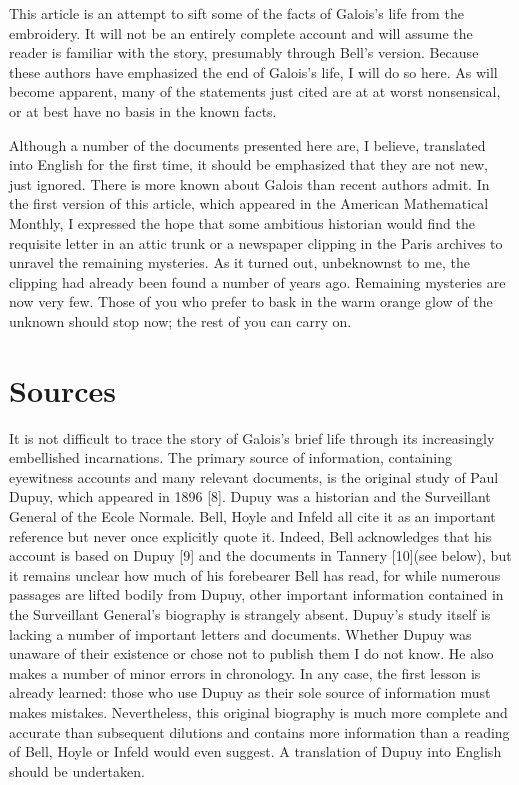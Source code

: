 \documentclass[12pt]{article}
\begin{document}
This article is an attempt to sift some of the facts of Galois's life from the embroidery. It will not be an entirely complete account and will assume the reader is familiar with the story, presumably through Bell's version. Because these authors have emphasized the end of Galois's life, I will do so here. As will become apparent, many of the statements just cited are at at worst nonsensical, or at best have no basis in the known facts.

Although a number of the documents presented here are, I believe, translated into English for the first time, it should be emphasized that they are not new, just ignored. There is more known about Galois than recent authors admit. In the first version of this article, which appeared in the American Mathematical Monthly, I expressed the hope that some ambitious historian would find the requisite letter in an attic trunk or a newspaper clipping in the Paris archives to unravel the remaining mysteries. As it turned out, unbeknownst to me, the clipping had already been found a number of years ago. Remaining mysteries are now very few. Those of you who prefer to bask in the warm orange glow of the unknown should stop now; the rest of you can carry on.

\section{Sources}

It is not difficult to trace the story of Galois's brief life through its increasingly embellished incarnations. The primary source of information, containing eyewitness accounts and many relevant documents, is the original study of Paul Dupuy, which appeared in 1896 [8]. Dupuy was a historian and the Surveillant General of the Ecole Normale. Bell, Hoyle and Infeld all cite it as an important reference but never once explicitly quote it. Indeed, Bell acknowledges that his account is based on Dupuy [9] and the documents in Tannery [10](see below), but it remains unclear how much of his forebearer Bell has read, for while numerous passages are lifted bodily from Dupuy, other important information contained in the Surveillant General's biography is strangely absent. Dupuy's study itself is lacking a number of important letters and documents. Whether Dupuy was unaware of their existence or chose not to publish them I do not know. He also makes a number of minor errors in chronology. In any case, the first lesson is already learned: those who use Dupuy as their sole source of information must makes mistakes. Nevertheless, this original biography is much more complete and accurate than subsequent dilutions and contains more information than a reading of Bell, Hoyle or Infeld would even suggest. A translation of Dupuy into English should be undertaken.
\end{document}
